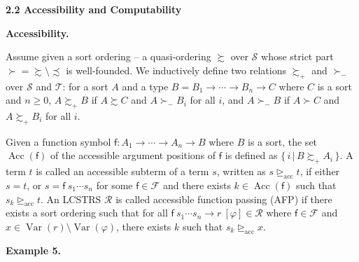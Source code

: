  
 
\par\medskip\noindent\textbf{2.2 Accessibility and Computability}\par
 
 
\par\medskip\noindent\textbf{Accessibility.}\par
 
 
Assume given a sort ordering – a quasi-ordering $\succsim$ over $\mathcal{S}$ whose strict part ${\succ}={\succsim}\setminus{\precsim}$ is well-founded. We inductively define two relations $\succsim_{+}$ and $\succ_{-}$ over $\mathcal{S}$ and $\mathcal{T}$: for a sort $A$ and a type $B={B}_{1}\rightarrow\cdots\rightarrow{B}_{n}\rightarrow C$ where $C$ is a sort and $n\geq 0$, $A\succsim_{+}B$ if $A\succsim C$ and $A\succ_{-}B_{i}$ for all $i$, and $A\succ_{-}B$ if $A\succ C$ and $A\succsim_{+}B_{i}$ for all $i$.\par
 
 
 
Given a function symbol $\mathsf{f}:{A}_{1}\rightarrow\cdots\rightarrow{A}_{n}\rightarrow B$ where $B$ is a sort, the set $\operatorname{Acc}(\mathsf{f})$ of the accessible argument positions of $\mathsf{f}$ is defined as $\{\,i\,|\,B\succsim_{+}A_{i}\,\}$. A term $t$ is called an accessible subterm of a term $s$, written as $s\trianglerighteq_{\mathrm{acc}}t$, if either $s=t$, or $s={\mathsf{f}}\ {{s}_{1}\cdots{s}_{n}}$ for some $\mathsf{f}\in\mathcal{F}$ and there exists $k\in\operatorname{Acc}(\mathsf{f})$ such that $s_{k}\trianglerighteq_{\mathrm{acc}}t$. An LCSTRS $\mathcal{R}$ is called accessible function passing (AFP) if there exists a sort ordering such that for all ${{\mathsf{f}}\ {{s}_{1}\cdots{s}_{n}}}\rightarrow{r}\ [\varphi]\in\mathcal{R}$ where $\mathsf{f}\in\mathcal{F}$ and $x\in\operatorname{Var}(r)\setminus\operatorname{Var}(\varphi)$, there exists $k$ such that $s_{k}\trianglerighteq_{\mathrm{acc}}x$.\par
 
 
 
\par\medskip\noindent\textbf{Example 5.}\par
 
